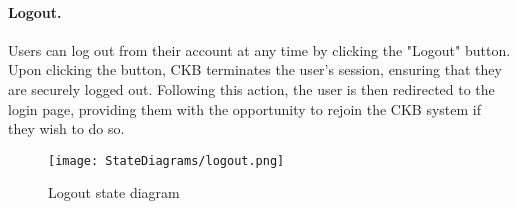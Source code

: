 \paragraph{Logout.}
Users can log out from their account at any time by clicking the "Logout" button. Upon clicking the button, CKB terminates the user's session, ensuring that they are securely logged out. Following this action, the user is then redirected to the login page, providing them with the opportunity to rejoin the CKB system if they wish to do so. 

\begin{figure}[H]
    \begin{center}
        \texttt{[image: StateDiagrams/logout.png]}
        \caption{Logout state diagram}
        \label{fig:logout_sd}%
    \end{center}
\end{figure}

